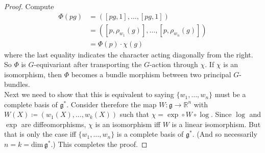 \documentclass[10pt,a4paper]{amsart}
\newtheorem{proposition}{Proposition}
\newcommand{\N}{\mathbb{N}}
\newcommand{\R}{\mathbb{R}}
\renewcommand{\dim}{\mathrm{dim}}
\begin{document}

\begin{proof}
    Compute
    \begin{equation}
    \begin{split}
        \mathsf{\Phi}(pg) &= ([pg,1],\dots,[pg,1])\\
        &= ([p,\rho_{w_1}(g)],\dots,[p,\rho_{w_n}(g)])\\
        &= \mathsf{\Phi}(p)\cdot \chi(g)
    \end{split}
    \end{equation}
    where the last equality indicates the character acting diagonally from the right. So $\mathsf{\Phi}$ is $G$-equivariant after transporting the $G$-action through $\chi$. If $\chi$ is an isomorphism, then $\mathsf{\Phi}$ becomes a bundle morphism between two principal $G$-bundles.\\
    Next we need to show that this is equivalent to saying $\{w_1,\dots,w_n\}$ must be a complete basis of $\mathfrak{g}^*$. Consider therefore the map $W\colon \mathfrak{g}\to \R^n$ with $W(X)\coloneqq (w_1(X),\dots,w_k(X))$ such that $\chi = \exp\circ W\circ \log$. Since $\log$ and $\exp$ are diffeomorphisms, $\chi$ is an isomorphism iff $W$ is a linear isomorphism. But that is only the case iff $\{w_1,\dots,w_n\}$ is a complete basis of $\mathfrak{g}^*$. (And so necessarily $n=k=\dim\,\mathfrak{g}^*$.) This completes the proof.
\end{proof}
\end{document}
